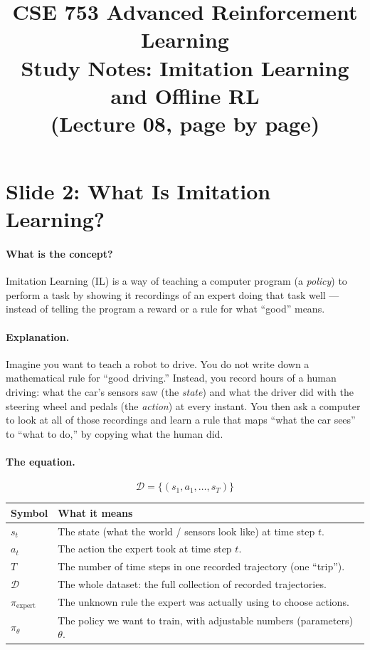 \documentclass[11pt]{article}
\title{CSE 753 Advanced Reinforcement Learning\\
Study Notes: Imitation Learning and Offline RL\\
\large (Lecture 08, page by page)}
\author{}
\date{}
\begin{document}
\maketitle
\sloppy

\section{Slide 2: What Is Imitation Learning?}

\paragraph{What is the concept?}
Imitation Learning (IL) is a way of teaching a computer program (a \emph{policy}) to
perform a task by showing it recordings of an expert doing that task well --- instead of
telling the program a reward or a rule for what ``good'' means.

\paragraph{Explanation.}
Imagine you want to teach a robot to drive. You do not write down a mathematical rule
for ``good driving.'' Instead, you record hours of a human driving: what the car's
sensors saw (the \emph{state}) and what the driver did with the steering wheel and pedals
(the \emph{action}) at every instant. You then ask a computer to look at all of those
recordings and learn a rule that maps ``what the car sees'' to ``what to do,'' by copying
what the human did.

\paragraph{The equation.}
$$\mathcal{D} = \{(s_1, a_1, \ldots, s_T)\}$$

\begin{center}
\begin{tabular}{@{}p{3.2cm}p{10.3cm}@{}}
\toprule
Symbol & What it means \\
\midrule
$s_t$ & The state (what the world / sensors look like) at time step $t$. \\
$a_t$ & The action the expert took at time step $t$. \\
$T$ & The number of time steps in one recorded trajectory (one ``trip''). \\
$\mathcal{D}$ & The whole dataset: the full collection of recorded trajectories. \\
$\pi_{\text{expert}}$ & The unknown rule the expert was actually using to choose actions. \\
$\pi_\theta$ & The policy we want to train, with adjustable numbers (parameters) $\theta$. \\
\bottomrule
\end{tabular}
\end{center}
\end{document}
